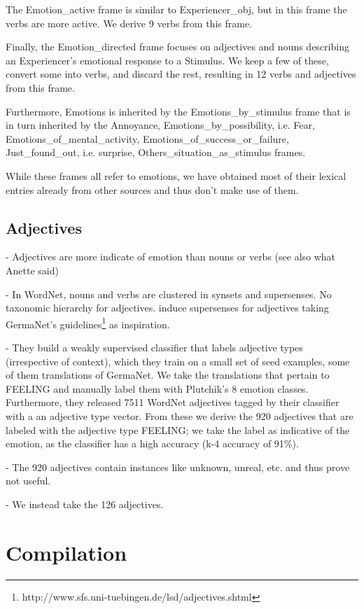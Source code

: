 The Emotion\_active frame is similar to Experiencer\_obj, but in this frame the verbs are more active. We derive 9 verbs from this frame.

Finally, the Emotion\_directed frame focuses on adjectives and nouns describing an Experiencer's emotional response to a Stimulus. We keep a few of these, convert some into verbs, and discard the rest, resulting in 12 verbs and adjectives from this frame.

Furthermore, Emotions is inherited by the Emotions\_by\_stimulus frame that is in turn inherited by the Annoyance, Emotions\_by\_possibility, i.e. Fear, Emotions\_of\_mental\_activity, Emotions\_of\_success\_or\_failure, Just\_found\_out, i.e. surprise, Others\_situation\_as\_stimulus frames.

While these frames all refer to emotions, we have obtained most of their lexical entries already from other sources and thus don't make use of them.

\subsection{Adjectives}

- Adjectives are more indicate of emotion than nouns or verbs (see also what Anette said)

- In WordNet, nouns and verbs are clustered in synsets and supersenses. No taxonomic hierarchy for adjectives. \cite{adjective_supersenses} induce supersenses for adjectives taking GermaNet's guidelines\footnote{http://www.sfs.uni-tuebingen.de/lsd/adjectives.shtml} as inspiration.

- They build a weakly supervised classifier that labels adjective types (irrespective of context), which they train on a small set of seed examples, some of them translations of GermaNet. We take the translations that pertain to FEELING and manually label them with Plutchik's 8 emotion classes. Furthermore, they released 7511 WordNet adjectives tagged by their classifier with a an adjective type vector. From these we derive the 920 adjectives that are labeled with the adjective type FEELING; we take the label as indicative of the emotion, as the classifier has a high accuracy (k-4 accuracy of 91\%).

- The 920 adjectives contain instances like unknown, unreal, etc. and thus prove not useful.

- We instead take the 126 adjectives. 


\section{Compilation}

